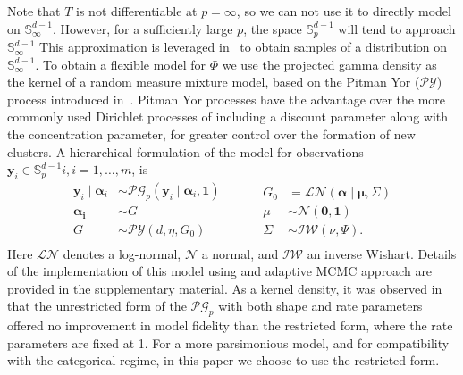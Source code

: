 Note that $T$ is not differentiable at $p = \infty$, so we can not use it to 
    directly model on ${\mathbb S}_{\infty}^{d-1}$. However, for a sufficiently 
    large $p$, the space ${\mathbb S}_p^{d-1}$ will tend to approach 
    $\mathbb{S}_{\infty}^{d-1}$ This approximation is leveraged 
    in~\cite{trubey:pg} to obtain samples of a distribution on 
    ${\mathbb S}_{\infty}^{d-1}$. To obtain a flexible model for $\Phi$ we use 
    the projected gamma density as the kernel of a random measure mixture model, 
    based on the Pitman Yor ($\mathcal{PY}$) process introduced 
    in~\cite{perman1992}. Pitman Yor processes have the advantage over the more 
    commonly used Dirichlet processes \citep{Ferguson74} of including a 
    discount parameter along with the concentration parameter, for greater 
    control over the formation of new clusters.  A hierarchical formulation of 
    the model for observations 
    $\bm{y}_i\in \mathbb{S}_{p}^{d-1}i, i=1, \ldots,m$, is
    \begin{equation}
        \label{eqn:modelsphere}
        \begin{aligned}
        \bm{y}_i \mid \bm{\alpha}_i &\sim \mathcal{PG}_p
                \left(\bm{y}_i\mid\bm{\alpha}_i, \bm{1}\right)\\
        \bm{\alpha_i} &\sim G\\
        G &\sim \mathcal{PY}\left(d, \eta, G_0\right)\\
        \end{aligned}
        ~\hspace{1cm}
        \begin{aligned}
        G_0 &= \mathcal{LN}\left(\bm{\alpha}\mid\bm{\mu},\Sigma\right)\\
        \mu &\sim \mathcal{N}\left(\bm{0},\bm{1}\right)\\
        \Sigma &\sim \mathcal{IW}\left(\nu, \Psi\right).
        \end{aligned}
    \end{equation}
    Here $\mathcal{LN}$ denotes a log-normal, $\mathcal{N}$ a normal, and 
    $\mathcal{IW}$ an inverse Wishart. Details of the implementation of this 
    model using and adaptive MCMC approach are provided in the supplementary 
    material.  As a kernel density, it was observed in \cite{trubey:pg} that 
    the unrestricted form of the $\mathcal{PG}_p$ with both shape and rate 
    parameters offered no improvement in model fidelity than the restricted 
    form, where the rate parameters are fixed at 1.  For a more parsimonious 
    model, and for compatibility with the categorical regime, in this paper we 
    choose to use the restricted form.
    
